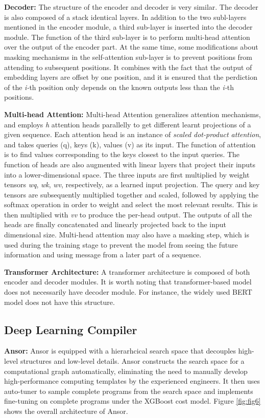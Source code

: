 \textbf{Decoder:} The structure of the encoder and decoder is very similar. The decoder is also composed of a stack identical layers. In addition to the two subl-layers
mentioned in the encoder module, a third sub-layer is inserted into the decoder module. The function of the third sub-layer is to perform multi-head attention over the 
output of the encoder part. At the same time, some modifications about masking mechanisms in the self-attention sub-layer is to prevent positions from attending to subsequent positions.
It combines with the fact that the output of embedding layers are offset by one position, and it is ensured that the perdiction of the \textit{i-}th position only 
depends on the known outputs less than the \textit{i-}th positions.

\textbf{Multi-head Attention:} Multi-head Attention generalizes attention mechanisms, and employs \textit{h} attention heads parallelly to get 
different learnt projections of a given sequence. Each attention head is an instance of \textit{scaled dot-product attention}, and takes queries (q),
keys (k), values (v) as its input. The function of attention is to find values corresponding to the keys closest to the input queries. The function of 
heads are also augmented with linear layers that project their inputs into a lower-dimensional space. The three inputs are first multiplied by weight
tensors \textit{wq}, \textit{wk}, \textit{wv}, respectively, as a learned input projection. The query and key tensors are subsequently multiplied together
and scaled, followed by applying the softmax operation in order to weight and select the most relevant results. This is then multiplied with \textit{vv} to 
produce the per-head output. The outputs of all the heads are finally concatenated and linearly projected back to the input dimensional size.
Multi-head attention may also have a masking step, which is used during the training stage to prevent the model from seeing the future information
and using message from a later part of a sequence. 



\textbf{Transformer Architecture:}
 A transformer architecture is composed of both encoder and decoder modules. It is worth noting that transformer-based model does not necessarily have 
decoder module. For instance, the widely used BERT model does not have this structure.


\subsection{Deep Learning Compiler}
\textbf{Ansor:} Ansor is equipped with a hierarhcical search space that decouples high-level structures and low-level details. 
Ansor constructs the search space for a computational graph automatically, 
eliminating the need to manually develop high-performance computing templates by the experienced engineers. 
It then uses auto-tuner to sample complete programs from the search space and implements fine-tuning on complete programs under the XGBoost cost model. 
Figure \ref{fig:fig6} shows the overall architecture of Ansor.




